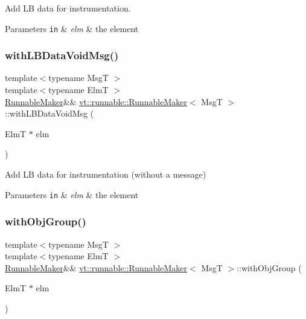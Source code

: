 Add LB data for instrumentation. 


\begin{DoxyParams}[1]{Parameters}
\mbox{\tt in}  & {\em elm} & the element \\
\hline
\end{DoxyParams}
\mbox{\label{structvt_1_1runnable_1_1_runnable_maker_a42a6e2d7b273b6bb61d6659c2651d3c5}} 
\subsubsection{\texorpdfstring{with\+L\+B\+Data\+Void\+Msg()}{withLBDataVoidMsg()}}
{\footnotesize\ttfamily template$<$typename MsgT $>$ \\
template$<$typename ElmT $>$ \\
\hyperlink{structvt_1_1runnable_1_1_runnable_maker}{Runnable\+Maker}\&\& \hyperlink{structvt_1_1runnable_1_1_runnable_maker}{vt\+::runnable\+::\+Runnable\+Maker}$<$ MsgT $>$\+::with\+L\+B\+Data\+Void\+Msg (\begin{DoxyParamCaption}\item[{ElmT $\ast$}]{elm }\end{DoxyParamCaption})\hspace{0.3cm}{\ttfamily [inline]}}



Add LB data for instrumentation (without a message) 


\begin{DoxyParams}[1]{Parameters}
\mbox{\tt in}  & {\em elm} & the element \\
\hline
\end{DoxyParams}
\mbox{\label{structvt_1_1runnable_1_1_runnable_maker_acc0749541ac045169d28e5748dc7d1ed}} 
\subsubsection{\texorpdfstring{with\+Obj\+Group()}{withObjGroup()}}
{\footnotesize\ttfamily template$<$typename MsgT $>$ \\
template$<$typename ElmT $>$ \\
\hyperlink{structvt_1_1runnable_1_1_runnable_maker}{Runnable\+Maker}\&\& \hyperlink{structvt_1_1runnable_1_1_runnable_maker}{vt\+::runnable\+::\+Runnable\+Maker}$<$ MsgT $>$\+::with\+Obj\+Group (\begin{DoxyParamCaption}\item[{ElmT $\ast$}]{elm }\end{DoxyParamCaption})\hspace{0.3cm}{\ttfamily [inline]}}



